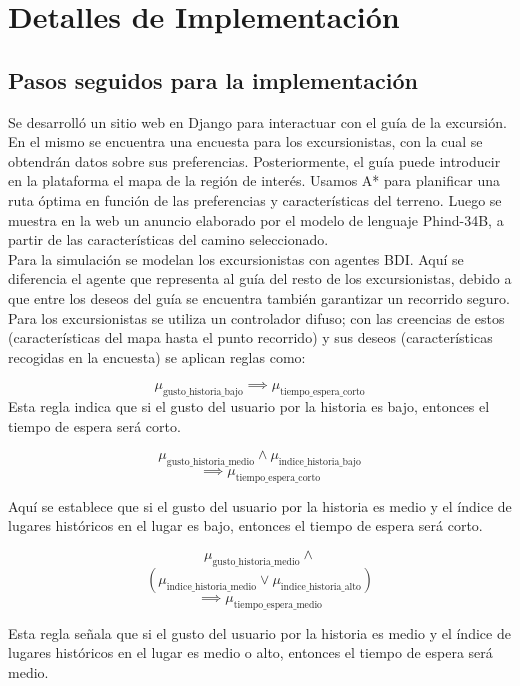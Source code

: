 \documentclass[10pt,twocolumn]{article}
\begin{document}
	\section{Detalles de Implementación}
	
	\subsection{Pasos seguidos para la implementación}
	Se desarrolló un sitio web en Django para interactuar con el guía de la excursión. En el mismo se encuentra una encuesta para los excursionistas, con la cual se obtendrán datos sobre sus preferencias. Posteriormente, el guía puede introducir en la plataforma el mapa de la región de interés. Usamos A* para planificar una ruta óptima en función de las preferencias y características del terreno. Luego se muestra en la web un anuncio elaborado por el modelo de lenguaje Phind-34B, a partir de las características del camino seleccionado.\\
	Para la simulación se modelan los excursionistas con agentes BDI. Aquí se diferencia el agente que representa al guía del resto de los excursionistas, debido a que entre los deseos del guía se encuentra también garantizar un recorrido seguro. Para los excursionistas se utiliza un controlador difuso; con las creencias de estos (características del mapa hasta el punto recorrido) y sus deseos (características recogidas en la encuesta) se aplican reglas como:
	
	$$
	 \mu_{\text{gusto\_historia\_bajo}} \implies \mu_{\text{tiempo\_espera\_corto}}
	$$
	Esta regla indica que si el gusto del usuario por la historia es bajo, entonces el tiempo de espera será corto.
	
	$$
	\mu_{\text{gusto\_historia\_medio}} \land \mu_{\text{indice\_historia\_bajo}}$$
	$$\implies \mu_{\text{tiempo\_espera\_corto}}$$
	
	
	Aquí se establece que si el gusto del usuario por la historia es medio y el índice de lugares históricos en el lugar es bajo, entonces el tiempo de espera será corto.
	
	$$
		\mu_{\text{gusto\_historia\_medio}}  \land $$
		 $$ \left( \mu_{\text{indice\_historia\_medio}}	
		 \lor \mu_{\text{indice\_historia\_alto}} \right)$$
		$$\implies \mu_{\text{tiempo\_espera\_medio}}$$

	Esta regla señala que si el gusto del usuario por la historia es medio y el índice de lugares históricos en el lugar es medio o alto, entonces el tiempo de espera será medio.
	
\end{document}
